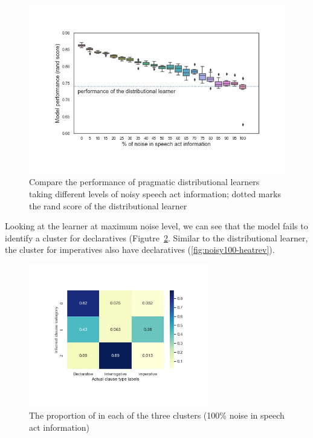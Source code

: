 \begin{figure}[H]
    \centering
    \includegraphics[width=1\textwidth]{figures/noisy-rand-compare.jpg}
    \caption{Compare the performance of pragmatic distributional learners taking different levels of noisy speech act information; dotted marks the rand score of the distributional learner}
    \label{fig:noisy-rand-compare}
\end{figure}

Looking at the learner at maximum noise level, we can see that the model fails to identify a cluster for declaratives (Figutre~\ref{fig:noisy100-heatmap}. Similar to the distributional learner, the cluster for imperatives also have declaratives (\ref{fig:noisy100-heatrev}). 



\begin{figure}[H]
    \centering
    \includegraphics[width=0.7\textwidth]{figures/noisy100-heatmap.jpg}
    \caption{The proportion of \diis{} in each of the three clusters (100\% noise in speech act information) }
    \label{fig:noisy100-heatmap}
\end{figure}

